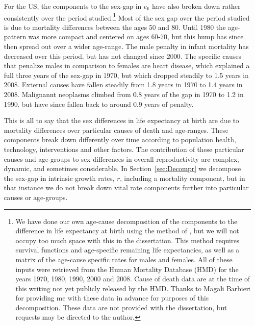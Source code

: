 For the US, the components to the sex-gap in $e_0$ have also broken down rather
consistently over the period studied.\footnote{We have done our own age-cause
decomposition of the components to the difference in life expectancy at birth using the method of
\citet{andreev2002algorithm}, but we will not occupy too much space with this
in the dissertation. This method requires survival functions and age-specific
remaining life expectancies, as well as a matrix of the age-cause specific 
rates for males and females. All of these inputs were retrieved from
the Human Mortality Database (HMD) for the years 1970, 1980, 1990, 2000 and
2008. Cause of death data are at the time of this writing not yet publicly 
released by the HMD. Thanks 
to Magali Barbieri for providing me with these data in advance for
purposes of this decomposition. These data are not provided with the
dissertation, but requests may be directed to the author.} Most of the sex gap
over the period studied is due to mortality differences between the ages 50 
and 80. Until 1980 the age-pattern was more compact and centered on ages 60-70, but this hump has since
then spread out over a wider age-range. The male penalty in infant
mortality has decreased over this period, but has not changed since
2000. The specific causes that penalize males in comparison to females are 
heart disease, which explained a full three
years of the sex-gap in 1970, but which dropped steadily to 1.5 years in 2008.
External causes have fallen steadily from 1.8 years in 1970 to 1.4 years in
2008. Malignannt neoplasms climbed from 0.8 years of the gap in 1970 to 1.2 in
1990, but have since fallen back to around 0.9 years of penalty. 

This is all to say that the sex differences in life expectancy at birth are due
to mortality differences over particular causes of death and age-ranges. These
components break down differently over time according to population health,
technology, interventions and other factors. The contribution of these
particular causes and age-groups to sex differences in overall reproductivity 
are complex, dynamic, and sometimes considerable. In Section~\ref{sec:Decompr}
we decompose the sex-gap in intrinsic growth rates, $r$, including a mortality 
component, but in that instance we do not break down vital rate components further into
particular causes or age-groups. 

